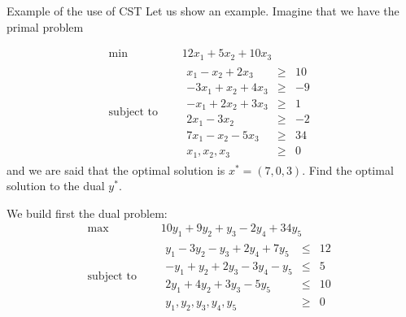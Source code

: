 \documentclass[c]{beamer}
\begin{document}
\begin{frame}[allowframebreaks]{Example of the use of CST}
  Let us show an example. Imagine that we have the primal problem

  \begin{equation*}
    \begin{aligned}
      \text{min } \quad & 12x_1+5x_2+10x_3 \\
      \text{subject to }\quad &
      \begin{array}{rcl}
        x_1-x_2+2x_3 &\geq &10 \\
        -3x_1+x_2+4x_3 &\geq &-9 \\
        -x_1+2x_2+3x_3 &\geq &1 \\
        2x_1-3x_2 &\geq &-2 \\
        7x_1-x_2-5x_3 &\geq &34 \\
        x_1,x_2,x_3 &\geq& 0
      \end{array}
    \end{aligned}
  \end{equation*}
  and we are said that the optimal solution is $x^*=(7,0,3)$. Find the optimal solution to the dual $y^*$.

  \framebreak

  We build first the dual problem:
  \begin{equation}
    \begin{aligned}
      \text{max } \quad & 10y_1+9y_2+y_3-2y_4+34y_5 \\
      \text{subject to }\quad &
      \begin{array}{rcl}
        y_1-3y_2-y_3+2y_4+7y_5 &\leq &12 \\
        -y_1+y_2+2y_3-3y_4-y_5&\leq&5\\
        2y_1+4y_2+3y_3-5y_5&\leq&10\\
        y_1,y_2,y_3,y_4,y_5 &\geq& 0
      \end{array}
    \end{aligned}
    \label{eq:dual}
  \end{equation}

  \framebreak


\end{frame}
\end{document}
